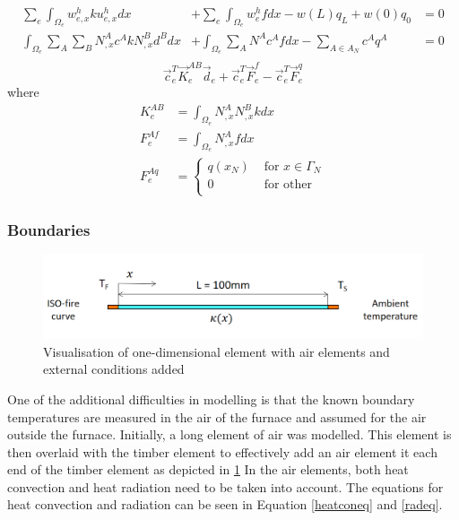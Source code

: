 	\begin{equation}
	\label{heateq4}
	\begin{aligned}
	\sum_e \int_{\Omega_e} w_{e,x}^h k  u_{e,x}^h dx &+ \sum_e \int_{\Omega_e} w_e^h f dx - w(L)q_L + w(0)q_0 &= 0\\
	\int_{\Omega_e} \sum_A \sum_B N_{,x}^A c^A k N_{,x}^B d^B dx  &+ \int_{\Omega_e} \sum_{A} N^A c^A f dx - \sum_{A\in A_N} c^A q^A &= 0\\
	\end{aligned}
	\end{equation}
	\begin{equation}
	\label{heateq5}
	\vec{c}_e^T \vec{K}_e^{AB} \vec{d}_e + \vec{c}_e^T \vec{F}_e^f -\vec{c}_e^T \vec{F}_e^q
	\end{equation}
	where
	\begin{equation*}
	\begin{aligned}
	K_e^{AB} &= \int_{\Omega_e}N_{,x}^AN_{,x}^B k dx\\
	F_e^{Af} &= \int_{\Omega_e}N_{,x}^A f dx\\
	F_e^{Aq} &= \begin{cases} q(x_N) &\text{ for } x \in \Gamma_N\\0 &\text{ for other }\\
	\end{cases}
	\end{aligned}
	\end{equation*}
	
	\subsubsection{Boundaries}
	\begin{figure}[H]\label{airelmfig}
	\centering
	\includegraphics[width = 0.75\linewidth]{figures/fem_fire_sketch.png}
	\caption{Visualisation of one-dimensional element with air elements and external conditions added}
	\end{figure}
	
	One of the additional difficulties in modelling is that the known boundary temperatures are measured in the air of the furnace and assumed for the air outside the furnace.
	Initially, a long element of air was modelled.
	This element is then overlaid with the timber element to effectively add an air element it each end of the timber element as depicted in \ref{airelmfig}
	In the air elements, both heat convection and heat radiation need to be taken into account.
	The equations for heat convection and radiation can be seen in Equation \ref{heatconeq} and \ref{radeq}.
	
